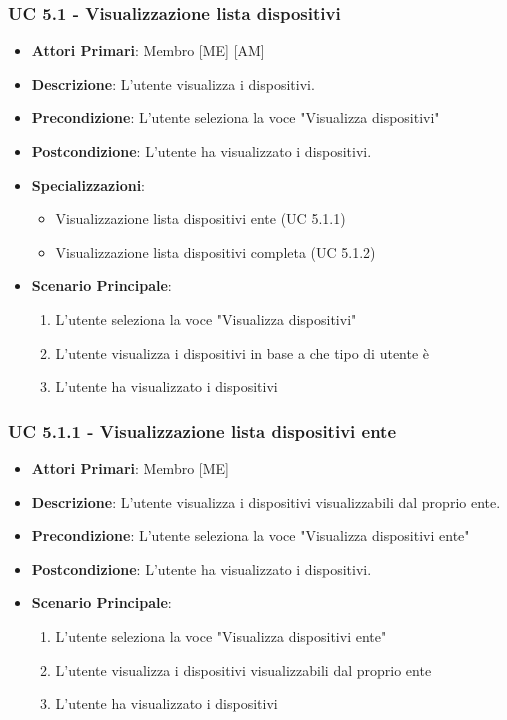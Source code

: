 			\subsubsection{UC 5.1 - Visualizzazione lista dispositivi}
			\begin{itemize}
				\item \textbf{Attori Primari}: Membro [ME] [AM]
				\item \textbf{Descrizione}: L'utente visualizza i dispositivi.
				\item \textbf{Precondizione}: L'utente seleziona la voce "Visualizza dispositivi"
				\item \textbf{Postcondizione}: L'utente ha visualizzato i dispositivi.
				\item \textbf{Specializzazioni}:
				\begin{itemize}
					\item Visualizzazione lista dispositivi ente (UC 5.1.1)
					\item Visualizzazione lista dispositivi completa (UC 5.1.2)
				\end{itemize}
				\item \textbf{Scenario Principale}:
				\begin{enumerate}
					\item{L'utente seleziona la voce "Visualizza dispositivi"}
					\item{L'utente visualizza i dispositivi in base a che tipo di utente è}
					\item{L'utente ha visualizzato i dispositivi}
				\end{enumerate}
			\end{itemize}
			
			\subsubsection{UC 5.1.1 - Visualizzazione lista dispositivi ente}
			\begin{itemize}
				\item \textbf{Attori Primari}: Membro [ME]
				\item \textbf{Descrizione}: L'utente visualizza i dispositivi visualizzabili dal proprio ente.
				\item \textbf{Precondizione}: L'utente seleziona la voce "Visualizza dispositivi ente"
				\item \textbf{Postcondizione}: L'utente ha visualizzato i dispositivi.
				\item \textbf{Scenario Principale}:
				\begin{enumerate}
					\item{L'utente seleziona la voce "Visualizza dispositivi ente"}
					\item{L'utente visualizza i dispositivi visualizzabili dal proprio ente}
					\item{L'utente ha visualizzato i dispositivi}
				\end{enumerate}
			\end{itemize}
			

